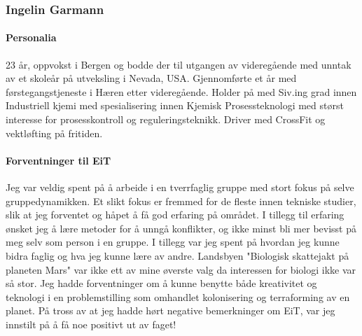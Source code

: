 \subsubsection{Ingelin Garmann}

\paragraph{Personalia}
23 år, oppvokst i Bergen og bodde der til utgangen av videregående med unntak av et skoleår på utveksling i Nevada, USA.
Gjennomførte et år med førstegangstjeneste i Hæren etter videregående.
Holder på med Siv.ing grad innen Industriell kjemi med spesialisering innen Kjemisk Prosessteknologi med størst interesse for prosesskontroll og reguleringsteknikk.
Driver med CrossFit og vektløfting på fritiden.

\paragraph{Forventninger til EiT}
Jeg var veldig spent på å arbeide i en tverrfaglig gruppe med stort fokus på selve gruppedynamikken.
Et slikt fokus er fremmed for de fleste innen tekniske studier, slik at jeg forventet og håpet å få god erfaring på området.
I tillegg til erfaring ønsket jeg å lære metoder for å unngå konflikter, og ikke minst bli mer bevisst på meg selv som person i en gruppe.
I tillegg var jeg spent på hvordan jeg kunne bidra faglig og hva jeg kunne lære av andre.
Landsbyen "Biologisk skattejakt på planeten Mars" var ikke ett av mine øverste valg da interessen for biologi ikke var så stor.
Jeg hadde forventninger om å kunne benytte både kreativitet og teknologi i en problemstilling som omhandlet kolonisering og terraforming av en planet.
På tross av at jeg hadde hørt negative bemerkninger om EiT, var jeg innstilt på å få noe positivt ut av faget!